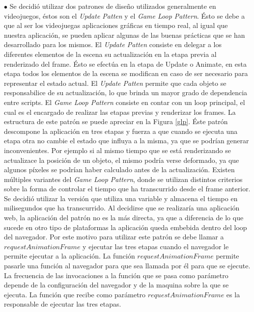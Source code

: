 \documentclass[12pt]{article}
\begin{document}
$\bullet$ Se decidió utilizar dos patrones de diseño utilizados generalmente en videojuegos, éstos son el \textit{Update Patten} y el \textit{Game Loop Pattern}\cite{patterns}\cite{engine}. Ésto se debe a que al ser los videojuegas aplicaciones gráficas en tiempo real, al igual que nuestra aplicación, se pueden aplicar algunas de las buenas prácticas que se han desarrollado para los mismos. El \textit{Update Patten} consiste en delegar a los diferentes elementos de la escena su actualización en la etapa previa al renderizado del frame. Ésto se efectúa en la etapa de Update o Animate, en esta etapa todos los elementos de la escena se modifican en caso de ser necesario para representar el estado actual. El \textit{Update Patten} permite que cada objeto se responsabilice de su actualización, lo que brinda un mayor grado de dependencia entre scripts. El \textit{Game Loop Pattern} consiste en contar con un loop principal, el cual es el encargado de realizar las etapas previas y renderizar los frames.  La estructura de este patrón se puede apreciar en la Figura \ref{glp}. Éste patrón descompone la aplicación en tres etapas y fuerza a que cuando se ejecuta una etapa otra no cambie el estado que influya a la misma, ya que se podrían generar inconvenientes. Por ejemplo si al mismo tiempo que se está renderizando se actualizace la posición de un objeto, el mismo podría verse deformado, ya que algunos píxeles se podrían haber calculado antes de la actualización. Existen múltiples variantes del \textit{Game Loop Pattern}\cite{patterns}, donde se utilizan distintos criterios sobre la forma de controlar el tiempo que ha transcurrido desde el frame anterior. Se decidió utilizar la versión que utiliza una variable y almacena el tiempo en milisegundos que ha transcurrido. Al decidirse que se realizaría una aplicación web, la aplicación del patrón no es la más directa, ya que a diferencia de lo que sucede en otro tipo de plataformas la aplicación queda embebida dentro del loop del navegador. Por este motivo para utilizar este patrón se debe llamar a $requestAnimationFrame$\cite{patterns} y ejecutar las tres etapas cuando el navegador le permite ejecutar a la aplicación. La función $requestAnimationFrame$ permite pasarle una función al navegador para que sea llamada por él  para que se ejecute. La frecuencia de las invocaciones a la función que se pasa como parámetro depende de la configuración del navegador y de la maquina sobre la que se ejecuta. La función que recibe como parámetro $requestAnimationFrame$ es la responsable de ejecutar las tres etapas. 
\end{document}
